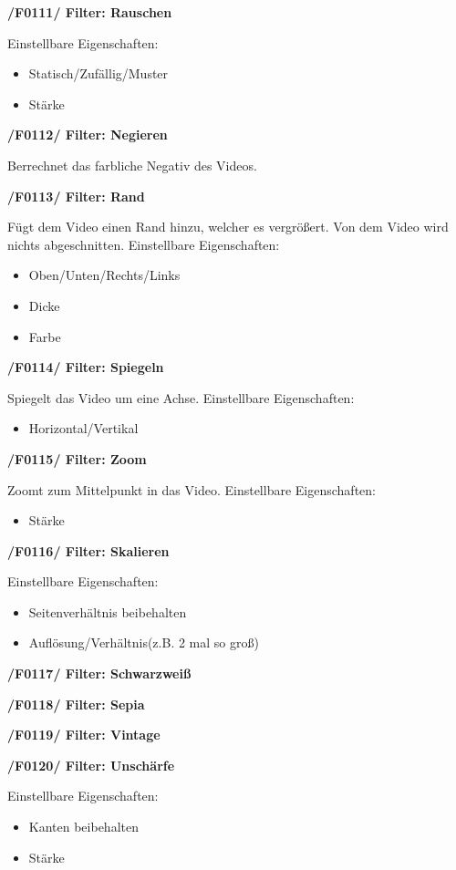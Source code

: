 \documentclass[parskip=full]{scrartcl}
\begin{document}
\textbf{/F0111/ Filter: Rauschen}

Einstellbare Eigenschaften:
\begin{itemize}
\item Statisch/Zufällig/Muster
\item Stärke
\end{itemize}

\textbf{/F0112/ Filter: Negieren}

Berrechnet das farbliche Negativ des Videos.

\textbf{/F0113/ Filter: Rand}

Fügt dem Video einen Rand hinzu, welcher es vergrößert. Von dem Video wird nichts abgeschnitten.
Einstellbare Eigenschaften:
\begin{itemize}
\item Oben/Unten/Rechts/Links
\item Dicke
\item Farbe
\end{itemize}

\textbf{/F0114/ Filter: Spiegeln}

Spiegelt das Video um eine Achse.
Einstellbare Eigenschaften:
\begin{itemize}
\item Horizontal/Vertikal
\end{itemize}

\textbf{/F0115/ Filter: Zoom}

Zoomt zum Mittelpunkt in das Video.
Einstellbare Eigenschaften:
\begin{itemize}
\item Stärke
\end{itemize}

\textbf{/F0116/ Filter: Skalieren}

Einstellbare Eigenschaften:
\begin{itemize}
\item Seitenverhältnis beibehalten
\item Auflösung/Verhältnis(z.B. 2 mal so groß)
\end{itemize}

\textbf{/F0117/ Filter: Schwarzweiß}

\textbf{/F0118/ Filter: Sepia}

\textbf{/F0119/ Filter: Vintage}

\textbf{/F0120/ Filter: Unschärfe}

Einstellbare Eigenschaften:
\begin{itemize}
\item Kanten beibehalten
\item Stärke
\end{itemize}
\end{document}
